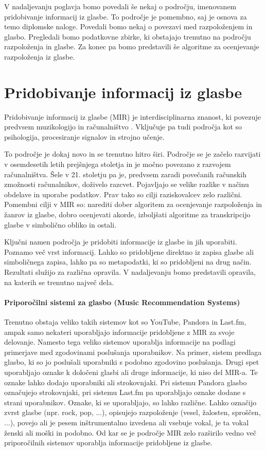 \documentclass[a4paper, 12pt]{book}
\begin{document}
{V nadaljevanju poglavja bomo povedali še nekaj o področju, imenovanem pridobivanje informacij iz glasbe. To področje je pomembno, saj je osnova za temo diplomske naloge. Povedali bomo nekaj o povezavi med razpoloženjem in glasbo. Pregledali bomo podatkovne zbirke, ki obstajajo trenutno na področju razpoloženja in glasbe. Za konec pa bomo predstavili še algoritme za ocenjevanje razpoloženja iz glasbe. 

\section{Pridobivanje informacij iz glasbe}

Pridobivanje informacij iz glasbe (MIR) je interdisciplinarna znanost, ki povezuje predvsem muzikologijo in računalništvo \cite{pesek2012prepoznavanje}. Vključuje pa tudi področja kot so psihologija, procesiranje signalov in strojno učenje.

To področje je dokaj novo in se trenutno hitro širi. Področje se je začelo razvijati v osemdesetih letih prejšnjega stoletja in je močno povezano z razvojem računalništva. Šele v 21. stoletju pa je, predvsem zaradi povečanih računskih zmožnosti računalnikov, doživelo razcvet. Pojavljajo se velike razlike v načinu obdelave in uporabe podatkov. Prav tako so cilji raziskovalcev zelo različni. Pomembni cilji v MIR so: narediti dober algoritem za ocenjevanje razpoloženja in žanrov iz glasbe, dobro ocenjevati akorde, izboljšati algoritme za transkripcijo glasbe v simbolično obliko in ostali. 

Ključni namen področja je pridobiti informacije iz glasbe in jih uporabiti. Poznamo več vrst informacij. Lahko so pridobljene direktno iz zapisa glasbe ali simboličnega zapisa, lahko pa so metapodatki, ki so pridobljeni na drug način. Rezultati služijo za različna opravila. V nadaljevanju bomo predstavili opravila, na katerih se trenutno največ dela.

\paragraph{Priporočilni sistemi za glasbo (Music Recommendation Systems)}

Trenutno obstaja veliko takih sistemov kot so YouTube, Pandora in Last.fm, ampak samo nekateri uporabljajo informacije pridobljene z MIR za svoje delovanje. Namesto tega veliko sistemov uporablja informacije na podlagi primerjave med zgodovinami poslušanja uporabnikov. Na primer, sistem predlaga glasbo, ki so jo poslušali uporabniki s podobno zgodovino poslušanja. Drugi spet uporabljajo oznake k določeni glasbi ali druge informacije, ki niso del MIR-a. Te oznake lahko dodajo uporabniki ali strokovnjaki. Pri sistemu Pandora glasbo označujejo strokovnjaki, pri sistemu Last.fm pa uporabljajo oznake dodane s strani uporabnikov. Oznake, ki se uporabljajo, so lahko različne. Lahko označijo zvrst glasbe (npr. rock, pop, ...), opisujejo razpoloženje (vesel, žalosten, sproščen, ...), povejo ali je pesem inštrumentalno izvedena ali vsebuje vokal, je ta vokal ženski ali moški in podobno. Od kar se je področje MIR zelo razširilo vedno več priporočilnih sistemov uporablja informacije pridobljene iz glasbe. 
 
}
\end{document}
